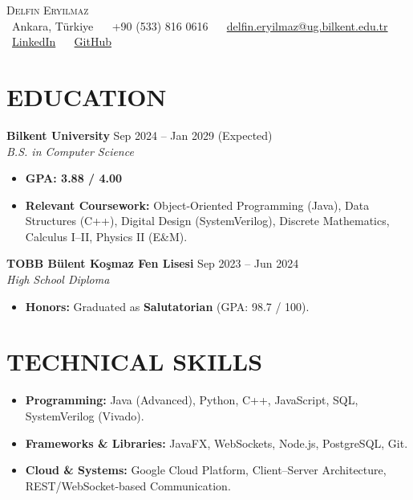 \documentclass[11pt,a4paper]{article}
\begin{document}
\pagestyle{empty}

\begin{center}
    {\Huge \scshape Delfin Eryılmaz} \\[2mm]
    \footnotesize
    {\faMapMarker\ Ankara, Türkiye} ~
    {\faPhone\ +90 (533) 816 0616} ~
    {\faEnvelope\ \href{mailto:delfin.eryilmaz@ug.bilkent.edu.tr}{delfin.eryilmaz@ug.bilkent.edu.tr}} ~
    {\faLinkedin\ \href{https://www.linkedin.com/in/delfin-eryilmaz-49659b369/}{LinkedIn}} ~
    {\faGithub\ \href{https://github.com/DelfinEryilmaz}{GitHub}}
    \vspace{-8pt}
\end{center}

\section{EDUCATION}
\noindent \textbf{Bilkent University} \hfill Sep 2024 -- Jan 2029 (Expected) \\
\textit{B.S. in Computer Science}
\begin{itemize}
    \item[\textbullet] \textbf{GPA: 3.88 / 4.00}
    \item[\textbullet] \textbf{Relevant Coursework:} Object-Oriented Programming (Java), Data Structures (C++), Digital Design (SystemVerilog), Discrete Mathematics, Calculus I–II, Physics II (E\&M).
\end{itemize}
\vspace{5pt}
\noindent \textbf{TOBB Bülent Koşmaz Fen Lisesi} \hfill Sep 2023 -- Jun 2024 \\
\textit{High School Diploma}
\begin{itemize}
    \item[\textbullet] \textbf{Honors:} Graduated as \textbf{Salutatorian} (GPA: 98.7 / 100).
\end{itemize}

\section{TECHNICAL SKILLS}
\begin{itemize}
    \item[\textbullet] \textbf{Programming:} Java (Advanced), Python, C++, JavaScript, SQL, SystemVerilog (Vivado).
    \item[\textbullet] \textbf{Frameworks \& Libraries:} JavaFX, WebSockets, Node.js, PostgreSQL, Git.
    \item[\textbullet] \textbf{Cloud \& Systems:} Google Cloud Platform, Client–Server Architecture, REST/WebSocket-based Communication.
\end{itemize}
\end{document}
